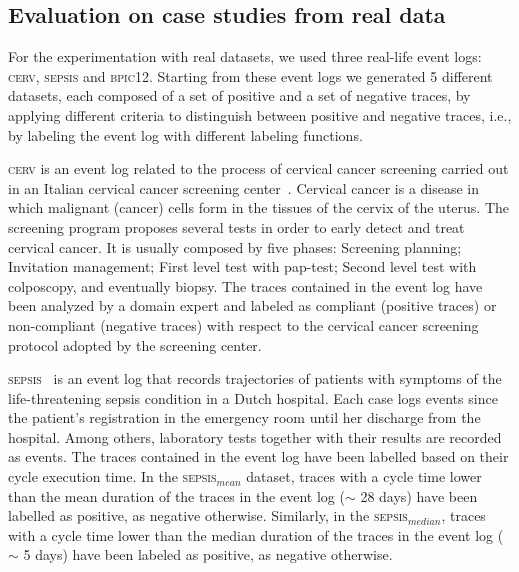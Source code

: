 \subsection{Evaluation on case studies from real data}
\label{sec:realdata}


For the experimentation with real datasets, we used three real-life event logs: \textsc{cerv}, \textsc{sepsis} and \textsc{bpic12}. Starting from these event logs we generated 5 different datasets, each composed of a set of positive and a set of negative traces, by applying different criteria to distinguish between positive and negative traces, i.e., by labeling the event log with different labeling functions. 

\textsc{cerv} is an event log related to the process of cervical cancer screening carried out in an Italian cervical cancer screening center~\cite{2007b-Lamma}. Cervical cancer is a disease in which malignant (cancer) cells form in the tissues of the cervix of the uterus. The screening program proposes several tests in order to early detect and treat cervical cancer. It is usually composed by five phases: Screening planning; Invitation management; First level test with pap-test; Second level test with colposcopy, and eventually biopsy. The traces contained in the event log have been analyzed by a domain expert and labeled as compliant (positive traces) or non-compliant (negative traces) with respect to the cervical cancer screening protocol adopted by the screening center.

\textsc{sepsis}~\cite{Sepsis} is an event log that records trajectories of patients with symptoms of the life-threatening sepsis condition in a Dutch hospital.
Each case logs events since the patient’s registration in the emergency room until her discharge from the hospital. Among others, laboratory tests together with their results are recorded as events. The traces contained in the event log have been labelled based on their cycle execution time. In the \textsc{sepsis$_{mean}$} dataset, traces with a cycle time lower than the mean duration of the traces in the event log ($\sim$ 28 days) have been labelled as positive, as negative otherwise. Similarly, in the \textsc{sepsis$_{median}$}, traces with a cycle time lower than the median duration of the traces in the event log ($\sim$ 5 days)  have been labeled as positive, as negative otherwise.  

